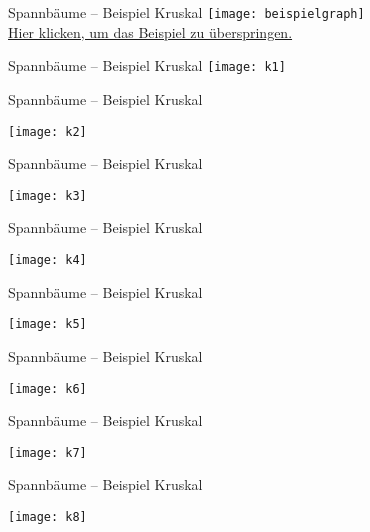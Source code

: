 \begin{frame}{Spannbäume – Beispiel Kruskal}
	\centering
	\texttt{[image: beispielgraph]} \\
	\vspace{-.3\baselineskip}\hyperlink{label:afterEx2}{Hier klicken, um das Beispiel zu überspringen.}
\end{frame}

\begin{frame}{Spannbäume – Beispiel Kruskal}
	\centering
	\texttt{[image: k1]}
\end{frame}

\begin{frame}{Spannbäume – Beispiel Kruskal}
	
		\centering
		\texttt{[image: k2]}
	
\end{frame}

\begin{frame}{Spannbäume – Beispiel Kruskal}
	
		\centering
		\texttt{[image: k3]}
	
\end{frame}

\begin{frame}{Spannbäume – Beispiel Kruskal}
	
		\centering
		\texttt{[image: k4]}
	
\end{frame}

\begin{frame}{Spannbäume – Beispiel Kruskal}
	
		\centering
		\texttt{[image: k5]}
	
\end{frame}

\begin{frame}{Spannbäume – Beispiel Kruskal}
	
		\centering
		\texttt{[image: k6]}
	
\end{frame}

\begin{frame}{Spannbäume – Beispiel Kruskal}
	
		\centering
		\texttt{[image: k7]}
	
\end{frame}

\begin{frame}{Spannbäume – Beispiel Kruskal}
	
		\centering
		\texttt{[image: k8]}
	
\end{frame}


